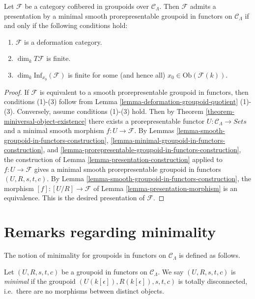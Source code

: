 \begin{theorem}
\label{theorem-presentation-deformation-groupoid}
Let $\mathcal{F}$ be a category cofibered in groupoids over $\mathcal 
C_\Lambda$.  Then $\mathcal{F}$ admits a presentation by a minimal smooth 
prorepresentable groupoid in functors on $\mathcal{C}_\Lambda$ if and only if 
the following conditions hold:
\begin{enumerate}
\item $\mathcal{F}$ is a deformation category.
\item $\dim_k T\mathcal{F}$ is finite.
\item $\dim_k \text{Inf}_{x_0}(\mathcal{F})$ is finite for some (and hence 
all) $x_0 \in \text{Ob}(\mathcal{F}(k))$.
\end{enumerate}
\end{theorem}

\begin{proof}
If $\mathcal{F}$ is equivalent to a smooth prorepresentable groupoid in 
functors, then conditions (1)-(3) follow from Lemma 
\ref{lemma-deformation-groupoid-quotient} (1)-(3).  Conversely, assume 
conditions (1)-(3) hold. Then by Theorem 
\ref{theorem-miniversal-object-existence} there exists a prorepresentable 
functor $U: \mathcal{C}_\Lambda \to \textit{Sets}$ and a minimal 
smooth morphism $f: U \to \mathcal{F}$.  By Lemmas 
\ref{lemma-smooth-groupoid-in-functors-construction}, 
\ref{lemma-minimal-groupoid-in-functors-construction}, and 
\ref{lemma-prorepresentable-groupoid-in-functors-construction}, the 
construction of Lemma \ref{lemma-presentation-construction} applied to $f: U 
\to \mathcal{F}$ gives a minimal smooth prorepresentable groupoid in 
functors $(U,R,s,t,c)$. By Lemma 
\ref{lemma-smooth-groupoid-in-functors-construction}, the morphism $[f]: [U/R] 
\to \mathcal{F}$ of Lemma \ref{lemma-presentation-morphism} is an 
equivalence.  This is the desired presentation of $\mathcal{F}$.
\end{proof}








\section{Remarks regarding minimality}
\label{section-minimality}


\noindent
The notion of minimality for groupoids in functors on $\mathcal{C}_\Lambda$ is 
defined as follows.

\begin{definition}
\label{definition-minimal-groupoid-in-functors}
Let $(U, R, s,t,c)$ be a groupoid in functors on $\mathcal{C}_\Lambda$.  We 
say $(U, R, s,t,c)$ is {\it minimal} if the groupoid 
$(U(k[\epsilon]),R(k[\epsilon]), s,t,c)$ is totally disconnected, i.e.\ 
there are no morphisms between distinct objects.
\end{definition}

